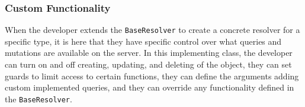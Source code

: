 \subsubsection{Custom Functionality}

When the developer extends the \verb!BaseResolver! to create a concrete resolver for a specific type, it is here that they have specific control over what queries and mutations are available on the server.  In this implementing class, the developer can turn on and off creating, updating, and deleting of the object, they can set guards to limit access to certain functions, they can define the arguments adding custom implemented queries, and they can override any functionality defined in the \verb!BaseResolver!.